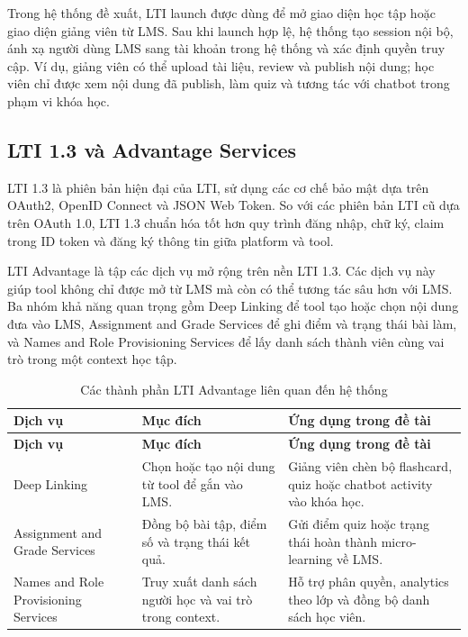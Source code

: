 Trong hệ thống đề xuất, LTI launch được dùng để mở giao diện học tập hoặc giao
diện giảng viên từ LMS. Sau khi launch hợp lệ, hệ thống tạo session nội bộ,
ánh xạ người dùng LMS sang tài khoản trong hệ thống và xác định quyền truy cập.
Ví dụ, giảng viên có thể upload tài liệu, review và publish nội dung; học viên
chỉ được xem nội dung đã publish, làm quiz và tương tác với chatbot trong phạm
vi khóa học.

\subsection{LTI 1.3 và Advantage Services}
\label{subsec:lti13-advantage-services}

LTI 1.3 là phiên bản hiện đại của LTI, sử dụng các cơ chế bảo mật dựa trên
OAuth2, OpenID Connect và JSON Web Token. So với các phiên bản LTI cũ dựa trên
OAuth 1.0, LTI 1.3 chuẩn hóa tốt hơn quy trình đăng nhập, chữ ký, claim trong
ID token và đăng ký thông tin giữa platform và tool.

LTI Advantage là tập các dịch vụ mở rộng trên nền LTI 1.3. Các dịch vụ này giúp
tool không chỉ được mở từ LMS mà còn có thể tương tác sâu hơn với LMS. Ba nhóm
khả năng quan trọng gồm Deep Linking để tool tạo hoặc chọn nội dung đưa vào LMS,
Assignment and Grade Services để ghi điểm và trạng thái bài làm, và Names and
Role Provisioning Services để lấy danh sách thành viên cùng vai trò trong một
context học tập.

\begin{longtable}{|p{3.5cm}|p{4.2cm}|p{6.3cm}|}
\caption{Các thành phần LTI Advantage liên quan đến hệ thống}
\label{tab:lti-advantage-services}\\
\hline
\textbf{Dịch vụ} & \textbf{Mục đích} & \textbf{Ứng dụng trong đề tài} \\
\hline
\endfirsthead
\hline
\textbf{Dịch vụ} & \textbf{Mục đích} & \textbf{Ứng dụng trong đề tài} \\
\hline
\endhead
Deep Linking & Chọn hoặc tạo nội dung từ tool để gắn vào LMS. & Giảng viên chèn bộ flashcard, quiz hoặc chatbot activity vào khóa học. \\
\hline
Assignment and Grade Services & Đồng bộ bài tập, điểm số và trạng thái kết quả. & Gửi điểm quiz hoặc trạng thái hoàn thành micro-learning về LMS. \\
\hline
Names and Role Provisioning Services & Truy xuất danh sách người học và vai trò trong context. & Hỗ trợ phân quyền, analytics theo lớp và đồng bộ danh sách học viên. \\
\hline
\end{longtable}

